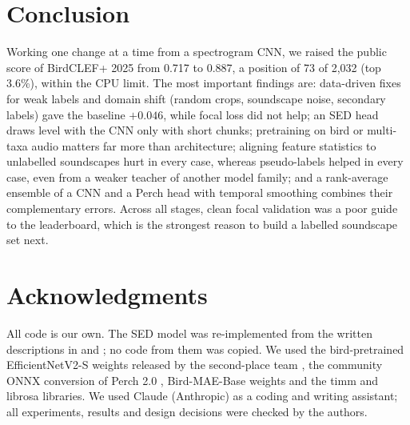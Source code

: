 \documentclass[letterpaper]{article} %
\begin{document}
\section{Conclusion}
Working one change at a time from a spectrogram CNN, we raised the public score of BirdCLEF+ 2025 from 0.717 to 0.887, a position of 73 of 2,032 (top 3.6\%), within the CPU limit. The most important findings are: data-driven fixes for weak labels and domain shift (random crops, soundscape noise, secondary labels) gave the baseline $+0.046$, while focal loss did not help; an SED head draws level with the CNN only with short chunks; pretraining on bird or multi-taxa audio matters far more than architecture; aligning feature statistics to unlabelled soundscapes hurt in every case, whereas pseudo-labels helped in every case, even from a weaker teacher of another model family; and a rank-average ensemble of a CNN and a Perch head with temporal smoothing combines their complementary errors. Across all stages, clean focal validation was a poor guide to the leaderboard, which is the strongest reason to build a labelled soundscape set next.

\section*{Acknowledgments}
All code is our own. The SED model was re-implemented from the written descriptions in \citet{babych2025first} and \citet{tattaka2021fourth}; no code from them was copied. We used the bird-pretrained EfficientNetV2-S weights released by the second-place team \citep{sydorskyi2025tackling}, the community ONNX conversion of Perch 2.0 \citep{calotriton2025perchonnx}, Bird-MAE-Base weights \citep{rauch2025can} and the timm \citep{wightman2019timm} and librosa \citep{mcfee2015librosa} libraries. We used Claude (Anthropic) as a coding and writing assistant; all experiments, results and design decisions were checked by the authors.


\end{document}
